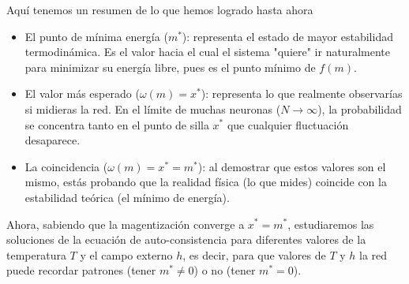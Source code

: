 \noindent
Aquí tenemos un resumen de lo que hemos logrado hasta ahora
\begin{itemize}
    \item El punto de mínima energía ($m^*$): representa el estado de mayor estabilidad termodinámica. Es el valor hacia el cual el sistema "quiere" ir naturalmente para minimizar su energía libre, pues es el punto mínimo de $f(m)$.
    \item El valor más esperado ($\omega(m) = x^*$): representa lo que realmente observarías si midieras la red. En el límite de muchas neuronas ($N \to \infty$), la probabilidad se concentra tanto en el punto de silla $x^*$ que cualquier fluctuación desaparece.
    \item La coincidencia ($\omega(m) = x^* = m^*$): al demostrar que estos valores son el mismo, estás probando que la realidad física (lo que mides) coincide con la estabilidad teórica (el mínimo de energía).
\end{itemize}
Ahora, sabiendo que la magentización converge a $x^*=m^*$, estudiaremos las soluciones de la ecuación de auto-consistencia para diferentes valores de la temperatura $T$ y el campo externo $h$, es decir, para que valores de $T$ y $h$ la red puede recordar patrones (tener $m^* \neq 0$) o no (tener $m^* = 0$). \\

